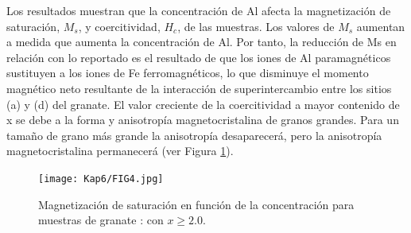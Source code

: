 Los resultados muestran que la concentración de Al afecta la magnetización de
saturación, $M_s$, y coercitividad, $H_c$, de las muestras. Los valores de
$M_s$
aumentan a medida que aumenta la concentración de Al. Por tanto, la reducción
de Ms en relación con lo reportado es el resultado de que los iones de Al
paramagnéticos sustituyen a los iones de Fe ferromagnéticos, lo que disminuye
el momento magnético neto resultante de la interacción de superintercambio
entre los sitios (a) y (d) del granate. El valor creciente de la coercitividad
a mayor contenido de x se debe a la forma y anisotropía magnetocristalina de
granos grandes. Para un tamaño de grano más grande la anisotropía desaparecerá,
pero la anisotropía magnetocristalina permanecerá \cite{hapishah2017phase} (ver Figura
\ref{fig:mr}).\\

\begin{figure}[t]
    \centering%

    \texttt{[image: Kap6/FIG4.jpg]}%
    \caption{Magnetización de saturación en función de la concentración para muestras de granate : con $x \geq 2.0$.}
    \label{fig:mr}
\end{figure}
